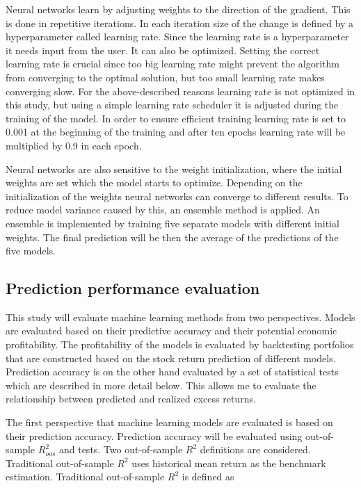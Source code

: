 \documentclass[12pt]{article}
\begin{document}
Neural networks learn by adjusting weights to the direction of the gradient. This is done in repetitive iterations. In each iteration size of the change is defined by a hyperparameter called learning rate. Since the learning rate is a hyperparameter it needs input from the user. It can also be optimized. Setting the correct learning rate is crucial since too big learning rate might prevent the algorithm from converging to the optimal solution, but too small learning rate makes converging slow. For the above-described reasons learning rate is not optimized in this study, but using a simple learning rate scheduler it is adjusted during the training of the model. In order to ensure efficient training learning rate is set to 0.001 at the beginning of the training and after ten epochs learning rate will be multiplied by 0.9 in each epoch. \par

Neural networks are also sensitive to the weight initialization, where the initial weights are set which the model starts to optimize. Depending on the initialization of the weights neural networks can converge to different results. To reduce model variance caused by this, an ensemble method is applied. An ensemble is implemented by training five separate models with different initial weights. The final prediction will be then the average of the predictions of the five models. \par

\subsection{Prediction performance evaluation}\label{PredictionPerformanceEvaluation}

This study will evaluate machine learning methods from two perspectives. Models are evaluated based on their predictive accuracy and their potential economic profitability. The profitability of the models is evaluated by backtesting portfolios that are constructed based on the stock return prediction of different models. Prediction accuracy is on the other hand evaluated by a set of statistical tests which are described in more detail below. This allows me to evaluate the relationship between predicted and realized excess returns. \par

The first perspective that machine learning models are evaluated is based on their prediction accuracy. Prediction accuracy will be evaluated using out-of-sample $R^{2}_{oos}$ and \citet{Diebold1995} tests. Two out-of-sample $R^{2}$ definitions are considered. Traditional out-of-sample $R^{2}$ uses historical mean return as the benchmark estimation. Traditional out-of-sample $R^{2}$ is defined as \par
\end{document}
